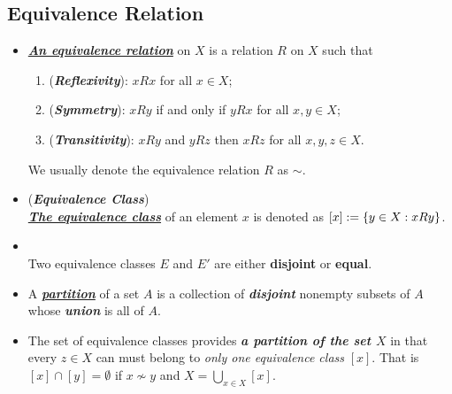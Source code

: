 \documentclass[11pt]{article}
\begin{document}
\subsection{Equivalence Relation}
\begin{itemize}
\item \begin{definition}
\underline{\emph{\textbf{An equivalence relation}}} on $X$ is a relation $R$ on $X$ such that 
\begin{enumerate}
\item (\emph{\textbf{Reflexivity}}): $xRx$ for all $x \in X$;
\item (\emph{\textbf{Symmetry}}): $xRy$ if and only if $yRx$ for all $x,y \in X$;
\item (\emph{\textbf{Transitivity}}): $xRy$ and $yRz$ then $xRz$ for all $x,y,z \in X$. 
\end{enumerate}
We usually denote the equivalence relation $R$ as $\sim$. 
\end{definition}

\item \begin{definition} (\emph{\textbf{Equivalence Class}})\\
\underline{\emph{\textbf{The equivalence class}}} of an element $x$ is denoted as $[x] := \left\{y \in X:  xRy\right\}$. 
\end{definition}

\item \begin{lemma} \citep{munkres2000topology}\\
Two equivalence classes $E$ and $E'$ are either \textbf{disjoint} or \textbf{equal}.
\end{lemma}


\item \begin{definition}
A \underline{\textbf{\emph{partition}}} of a set $A$ is a collection of \textbf{\emph{disjoint}} nonempty subsets of $A$ whose \textbf{\emph{union}} is all of $A$.
\end{definition}

\item \begin{remark}
The set of equivalence classes provides \emph{\textbf{a partition of the set $X$}} in that every $z \in X$ can must belong to \emph{only one equivalence class} $[x]$. That is $[x] \cap [y] = \emptyset$ if $x \not\sim y$ and $X = \bigcup_{x \in X}[x]$.
\end{remark}


\end{itemize}
\end{document}
